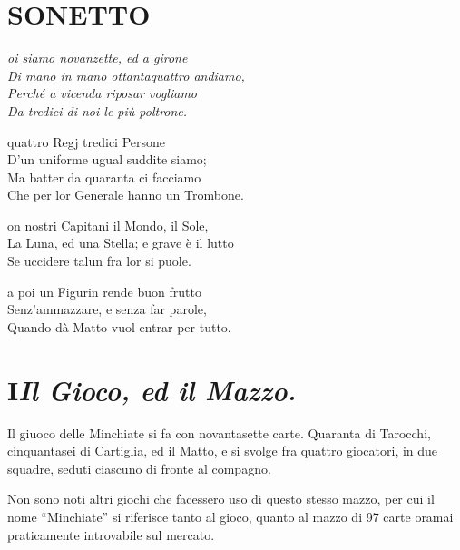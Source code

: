 \documentclass[11pt,a6paper]{article}
\begin{document}
\section*{SONETTO}
{\it
\-\hspace{-6pt}{\LARGE N}oi siamo novanzette, ed a girone\\
Di mano in mano ottantaquattro andiamo, \\
Perché a vicenda riposar vogliamo \\
Da tredici di noi le più poltrone. 

\vspace{6pt}

\noindent\-\hspace{-6pt}{\LARGE A} quattro Regj tredici Persone\\
D'un uniforme ugual suddite siamo;\\ 
Ma batter da quaranta ci facciamo \\
Che per lor Generale hanno un Trombone. 

\vspace{6pt}

\noindent\-\hspace{-6pt}{\LARGE S}on nostri Capitani il Mondo, il Sole,\\
La Luna, ed una Stella; e grave è il lutto \\
Se uccidere talun fra lor si puole. 

\vspace{6pt}

\noindent\-\hspace{-6pt}{\LARGE M}a poi un Figurin rende buon frutto\\
Senz'ammazzare, e senza far parole, \\
Quando dà Matto vuol entrar per tutto.
}
\clearpage
{}

\section{I\hfill{\large\mdseries\slshape Il Gioco, ed il Mazzo.}}

Il giuoco delle Minchiate si fa con novantasette carte. Quaranta di
Tarocchi, cinquantasei di Cartiglia, ed il Matto, e si svolge fra quattro
giocatori, in due squadre, seduti ciascuno di fronte al compagno.

Non sono noti altri giochi che facessero uso di questo stesso mazzo, per cui
il nome ``Minchiate'' si riferisce tanto al gioco, quanto al mazzo di 97
carte oramai praticamente introvabile sul mercato.
\end{document}
